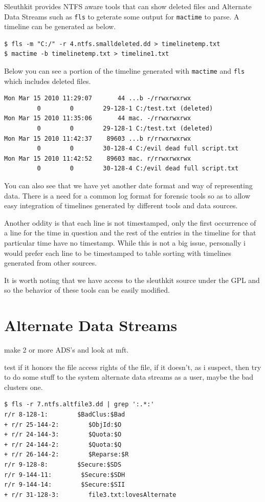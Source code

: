 \documentclass[a4paper,
    11pt,
    normalheadings,
    parindent,
    UKenglish,
    abstracton,
    ]{scrartcl}
\begin{document}
Sleuthkit provides NTFS aware tools that can show deleted files and Alternate Data Streams such as \texttt{fls} to geterate some output for \texttt{mactime} to parse. A timeline can be generated as below.

\begin{verbatim}
$ fls -m "C:/" -r 4.ntfs.smalldeleted.dd > timelinetemp.txt
$ mactime -b timelinetemp.txt > timeline1.txt
\end{verbatim}

Below you can see a portion of the timeline generated with \texttt{mactime} and \texttt{fls} which includes deleted files.

\begin{verbatim}
Mon Mar 15 2010 11:29:07       44 ...b -/rrwxrwxrwx
         0        0        29-128-1 C:/test.txt (deleted)
Mon Mar 15 2010 11:35:06       44 mac. -/rrwxrwxrwx
         0        0        29-128-1 C:/test.txt (deleted)
Mon Mar 15 2010 11:42:37    89603 ...b r/rrwxrwxrwx
         0        0        30-128-4 C:/evil dead full script.txt
Mon Mar 15 2010 11:42:52    89603 mac. r/rrwxrwxrwx
         0        0        30-128-4 C:/evil dead full script.txt
\end{verbatim}
You can also see that we have yet another date format and way of representing data. There is a need for a common log format for forensic tools so as to allow easy integration of timelines generated by different tools and data sources.

Another oddity is that each line is not timestamped, only the first occurrence of a line for the time in question and the rest of the entries in the timeline for that particular time have no timestamp. While this is not a big issue, personally i would prefer each line to be timestamped to table sorting with timelines generated from other sources.

It is worth noting that we have access to the sleuthkit source under the GPL and so the behavior of these tools can be easily modified.

\section{Alternate Data Streams}
make 2 or more ADS's and look at mft.

test if it honors the file access rights of the file, if it doesn't, as i suspect, then try to do some stuff to the system alternate data streams as a user, maybe the bad clusters one.

\begin{verbatim}
$ fls -r 7.ntfs.altfile3.dd | grep ':.*:'
r/r 8-128-1:        $BadClus:$Bad
+ r/r 25-144-2:        $ObjId:$O
+ r/r 24-144-3:        $Quota:$O
+ r/r 24-144-2:        $Quota:$Q
+ r/r 26-144-2:        $Reparse:$R
r/r 9-128-8:        $Secure:$SDS
r/r 9-144-11:        $Secure:$SDH
r/r 9-144-14:        $Secure:$SII
+ r/r 31-128-3:        file3.txt:lovesAlternate
\end{verbatim}
\end{document}
